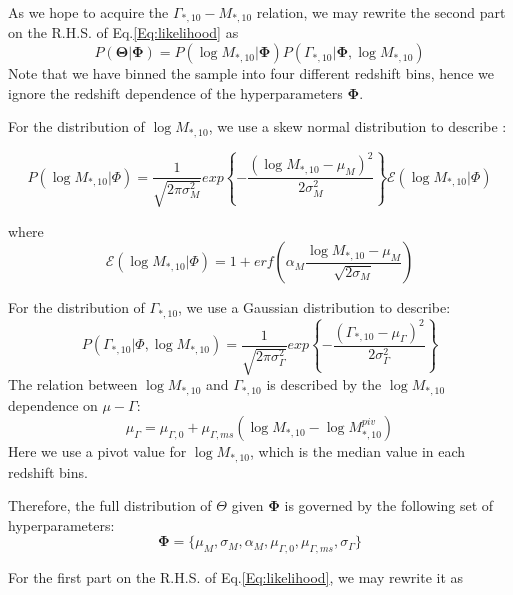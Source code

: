 \documentclass[fleqn,usenatbib]{mnras}
\begin{document}
\par As we hope to acquire the $\Gamma_{*,10} -M_{*,10}$  relation, we may rewrite the second part on the R.H.S. of Eq.\ref{Eq:likelihood} as
\begin{equation}
    P(\mathbf{\Theta}|\mathbf{\Phi}) =  P(\log M_{*,10}|\mathbf{\Phi})P(\Gamma_{*,10}|\mathbf{\Phi},\log M_{*,10})
\end{equation}
Note that we have binned the sample into four different redshift bins, hence we ignore the redshift dependence of the hyperparameters $\mathbf{\Phi}$.
\par  For the distribution of $\log M_{*,10}$, we use a skew normal distribution to describe : 
\begin{small}
   \begin{equation}
        P\left(\log M_{*,10}|\Phi\right) = \frac{1}{\sqrt{2\pi\sigma^2_M}}exp\left\{-\frac{(\log M_{*,10} - \mu_M)^2}{2\sigma_M^2}\right\}\mathcal{E}\left(\log M_{*,10} | \Phi\right)
    \end{equation} 
\end{small}
where
\begin{equation}
    \mathcal{E}\left(\log M_{*,10} | \Phi\right) = 1 + erf\left(\alpha_M\frac{\log M_{*,10} - \mu_M}{\sqrt{2\sigma_M}}\right)
\end{equation}
\par For the distribution of $\Gamma_{*,10}$, we use a Gaussian distribution to describe:
\begin{equation}
    P\left(\Gamma_{*,10}|\Phi,\log M_{*,10}\right) = \frac{1}{\sqrt{2\pi\sigma^2_{\Gamma}}}exp\left\{-\frac{(\Gamma_{*,10} - \mu_{\Gamma})^2}{2\sigma_{\Gamma}^2}\right\}
\end{equation}
The relation between $\log M_{*,10}$ and $\Gamma_{*,10}$ is described by the $\log M_{*,10}$ dependence on $\mu-\Gamma$:
\begin{equation}
    \label{eq:mg_relation}
    \mu_{\Gamma} = \mu_{\Gamma,0} + \mu_{\Gamma, ms}\left(\log M_{*,10} - \log M^{piv}_{*,10}\right)
\end{equation}
Here we use a pivot value for $\log M_{*,10}$, which is the median value in each redshift bins.
\par Therefore, the full distribution of $\Theta$ given $\mathbf{\Phi}$ is governed by the following set of hyperparameters:
\begin{equation}
    \mathbf{\Phi} = \{ \mu_M, \sigma_M, \alpha_M, \mu_{\Gamma,0}, \mu_{\Gamma, ms}, \sigma_{\Gamma} \}
\end{equation}
\par For the first part on the R.H.S. of Eq.\ref{Eq:likelihood}, we may rewrite it as
\end{document}
